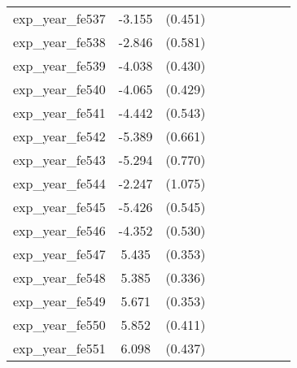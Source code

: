 {\begin{tabular}{l*{4}{cc}}
exp\_year\_fe537&   -3.155\sym{***}&  (0.451)&                  &         &                  &         &                  &         \\
exp\_year\_fe538&   -2.846\sym{***}&  (0.581)&                  &         &                  &         &                  &         \\
exp\_year\_fe539&   -4.038\sym{***}&  (0.430)&                  &         &                  &         &                  &         \\
exp\_year\_fe540&   -4.065\sym{***}&  (0.429)&                  &         &                  &         &                  &         \\
exp\_year\_fe541&   -4.442\sym{***}&  (0.543)&                  &         &                  &         &                  &         \\
exp\_year\_fe542&   -5.389\sym{***}&  (0.661)&                  &         &                  &         &                  &         \\
exp\_year\_fe543&   -5.294\sym{***}&  (0.770)&                  &         &                  &         &                  &         \\
exp\_year\_fe544&   -2.247\sym{*}  &  (1.075)&                  &         &                  &         &                  &         \\
exp\_year\_fe545&   -5.426\sym{***}&  (0.545)&                  &         &                  &         &                  &         \\
exp\_year\_fe546&   -4.352\sym{***}&  (0.530)&                  &         &                  &         &                  &         \\
exp\_year\_fe547&    5.435\sym{***}&  (0.353)&                  &         &                  &         &                  &         \\
exp\_year\_fe548&    5.385\sym{***}&  (0.336)&                  &         &                  &         &                  &         \\
exp\_year\_fe549&    5.671\sym{***}&  (0.353)&                  &         &                  &         &                  &         \\
exp\_year\_fe550&    5.852\sym{***}&  (0.411)&                  &         &                  &         &                  &         \\
exp\_year\_fe551&    6.098\sym{***}&  (0.437)&                  &         &                  &         &                  &         \\

\end{tabular}}
